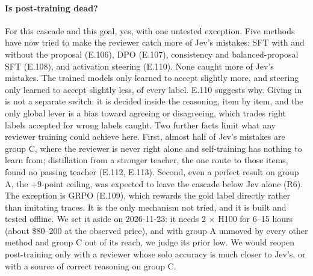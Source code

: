\documentclass[11pt]{article}
\renewcommand{\_}{\origunderscore\allowbreak}
\begin{document}
\paragraph{Is post-training dead?} For this cascade and this goal, yes, with one untested exception. Five methods have now tried to make the reviewer catch more of Jev's mistakes: SFT with and without the proposal (E.106), DPO (E.107), consistency and balanced-proposal SFT (E.108), and activation steering (E.110). None caught more of Jev's mistakes. The trained models only learned to accept slightly more, and steering only learned to accept slightly less, of every label. E.110 suggests why. Giving in is not a separate switch: it is decided inside the reasoning, item by item, and the only global lever is a bias toward agreeing or disagreeing, which trades right labels accepted for wrong labels caught. Two further facts limit what any reviewer training could achieve here. First, almost half of Jev's mistakes are group C, where the reviewer is never right alone and self-training has nothing to learn from; distillation from a stronger teacher, the one route to those items, found no passing teacher (E.112, E.113). Second, even a perfect result on group A, the $+9$-point ceiling, was expected to leave the cascade below Jev alone (R6). The exception is GRPO (E.109), which rewards the gold label directly rather than imitating traces. It is the only mechanism not tried, and it is built and tested offline. We set it aside on 2026-11-23: it needs 2 $\times$ H100 for 6--15 hours (about \$80--200 at the observed price), and with group A unmoved by every other method and group C out of its reach, we judge its prior low. We would reopen post-training only with a reviewer whose solo accuracy is much closer to Jev's, or with a source of correct reasoning on group C.
\end{document}
